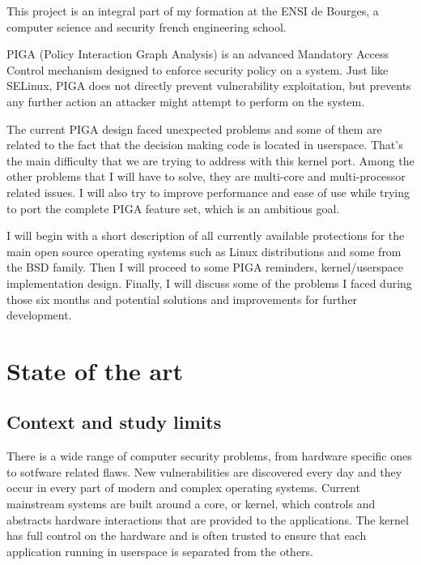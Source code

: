 \documentclass[pdftex,a4paper,titlepage,11pt]{article}
\begin{document}
This project is an integral part of my formation at the ENSI de Bourges, a
computer science and security french engineering school.

\bigskip

PIGA (Policy Interaction Graph Analysis) is an advanced Mandatory Access
Control mechanism designed to enforce security policy on a system. Just like
SELinux, PIGA does not directly prevent vulnerability exploitation, but
prevents any further action an attacker might attempt to perform on the system.

\bigskip

The current PIGA design faced unexpected problems and some of them are related
to the fact that the decision making code is located in userspace. That's the
main difficulty that we are trying to address with this kernel port. Among the
other problems that I will have to solve, they are multi-core and
multi-processor related issues. I will also try to improve performance and ease
of use while trying to port the complete PIGA feature set, which is an
ambitious goal.

\bigskip

I will begin with a short description of all currently available protections
for the main open source operating systems such as Linux distributions and some
from the BSD family. Then I will proceed to some PIGA reminders,
kernel/userspace implementation design. Finally, I will discuss some of the
problems I faced during those six months and potential solutions and
improvements for further development.


\newpage

\section{State of the art}

\subsection{Context and study limits}


There is a wide range of computer security problems, from hardware specific
ones to sotfware related flaws. New vulnerabilities are discovered every day
and they occur in every part of modern and complex operating systems. Current
mainstream systems are built around a core, or kernel, which controls and
abstracts hardware interactions that are provided to the applications. The
kernel has full control on the hardware and is often trusted to ensure that
each application running in userspace is separated from the others.
\end{document}
